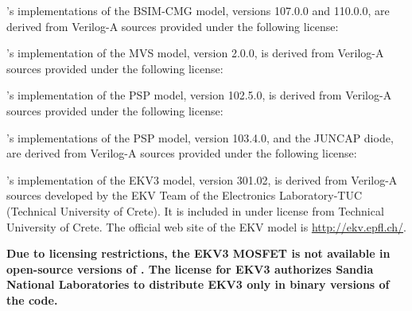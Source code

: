 \Xyce{}'s implementations of the BSIM-CMG model, versions 107.0.0 and 110.0.0,
are derived from Verilog-A sources provided under the following license:


\Xyce{}'s implementation of the MVS model, version 2.0.0, is derived from
Verilog-A sources provided under the following license:


\Xyce{}'s implementation of the PSP model, version 102.5.0, is derived from
Verilog-A sources provided under the following license:


\Xyce{}'s implementations of the PSP model, version 103.4.0, and the JUNCAP
diode, are derived from Verilog-A sources provided under the following license:


\Xyce{}'s implementation of the EKV3 model, version 301.02, is derived from
Verilog-A sources developed by the EKV Team of the Electronics Laboratory-TUC
(Technical University of Crete).  It is included in \Xyce{} under license from
Technical University of Crete.  The official web site of the EKV model is
\url{http://ekv.epfl.ch/}.

\textbf{Due to licensing restrictions, the EKV3 MOSFET is not available in
     open-source versions of \Xyce{}.  The license for EKV3 authorizes Sandia
     National Laboratories to distribute EKV3 only in binary versions of the code.}

